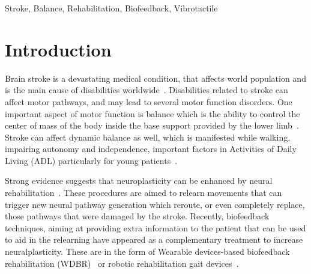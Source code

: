 \documentclass[conference]{IEEEtran}
\begin{document}
\maketitle


\begin{IEEEkeywords}
Stroke, Balance, Rehabilitation, Biofeedback, Vibrotactile
\end{IEEEkeywords}

\section{Introduction}

Brain stroke is a devastating medical condition, that affects world population and is the main cause of disabilities worldwide~\cite{Caplan.etal2023}.  Disabilities related to stroke can affect motor pathways, and may lead to several motor function disorders.   One important aspect of motor function is balance which is the ability to control the center of mass of the body inside the base support provided by the lower limb~\cite{Bowman2021}.  Stroke can affect dynamic balance as well,  which is manifested while walking, impairing autonomy and independence, important factors in Activities of Daily Living (ADL) particularly for young patients~\cite{Afrasiabifar.etal2020,Donato.etal2016}.


Strong evidence suggests that neuroplasticity can be enhanced by neural rehabilitation~\cite{DeAngelis.etal2021,Albert.etal2012}.  These procedures are aimed to relearn movements that can trigger new neural pathway generation which reroute, or even completely replace, those pathways that were damaged by the stroke.   Recently, biofeedback techniques, aiming at providing extra information to the patient that can be used to aid in the relearning have appeared as a complementary treatment to increase neuralplasticity. These are in the form of Wearable devices-based biofeedback rehabilitation (WDBR)~\cite{Peake.etal2018} or robotic rehabilitation gait devices~\cite{Zhao.etal2022,Peshkin.etal2005,Tong.etal2006}.  
\end{document}
